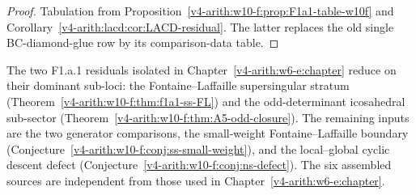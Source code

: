 \begin{proof}
Tabulation from Proposition~\ref{v4-arith:w10-f:prop:F1a1-table-w10f}
and Corollary~\ref{v4-arith:lacd:cor:LACD-residual}. The latter replaces the
old single BC-diamond-glue row by its comparison-data table.
\end{proof}

The two F1.a.1 residuals isolated in
Chapter~\ref{v4-arith:w6-e:chapter} reduce on their dominant sub-loci:
the Fontaine--Laffaille supersingular stratum
(Theorem~\ref{v4-arith:w10-f:thm:f1a1-ss-FL}) and the odd-determinant
icosahedral sub-sector (Theorem~\ref{v4-arith:w10-f:thm:A5-odd-closure}).
The remaining inputs are the two generator comparisons, the
small-weight Fontaine--Laffaille boundary
(Conjecture~\ref{v4-arith:w10-f:conj:ss-small-weight}), and the local--global
cyclic descent defect (Conjecture~\ref{v4-arith:w10-f:conj:ns-defect}). The six
assembled sources are independent from those used in
Chapter~\ref{v4-arith:w6-e:chapter}.
